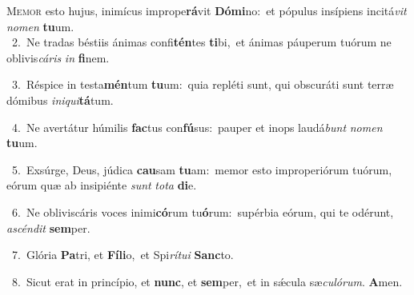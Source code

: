 \lettrine{\initial\textcolor{\initialcolor}{M}}{emor} esto hujus, inimícus imprope\-\textbf{rá}\-vit \textbf{Dó}\-\textbf{mi}no:~\star et pópulus insípiens incitá\textit{vit} \textit{no}\-\textit{men} \textbf{tu}\-um.\\
{\numbfont\textcolor{\numbcolor}{~2.}}~Ne tradas béstiis ánimas confi\-\textbf{tén}\-tes \textbf{ti}\-bi,~\star et ánimas páuperum tuórum ne oblivis\-\textit{cá}\-\textit{ris} \textit{in} \textbf{fi}\-nem.\par
{\numbfont\textcolor{\numbcolor}{~3.}}~Réspice in testa\-\textbf{mén}\-tum \textbf{tu}\-um:~\star quia repléti sunt, qui obscuráti sunt terræ dómibus \textit{in}\-\textit{i}\textit{qui}\textbf{tá}tum.\par
{\numbfont\textcolor{\numbcolor}{~4.}}~Ne avertátur húmilis \textbf{fac}\-tus con\-\textbf{fú}\-sus:~\star pauper et inops laudá\textit{bunt} \textit{no}\-\textit{men} \textbf{tu}\-um.\par
{\numbfont\textcolor{\numbcolor}{~5.}}~Exsúrge, Deus, júdica \textbf{cau}\-sam \textbf{tu}\-am:~\star memor esto improperiórum tuórum, eórum quæ ab insipiénte \textit{sunt} \textit{to}\-\textit{ta} \textbf{di}\-e.\par
{\numbfont\textcolor{\numbcolor}{~6.}}~Ne obliviscáris voces inimi\-\textbf{có}\-rum tu\-\textbf{ó}\-rum:~\star supérbia eórum, qui te odérunt, \textit{a}\-\textit{scén}\textit{dit} \textbf{sem}\-per.\par
{\numbfont\textcolor{\numbcolor}{~7.}}~Glória \textbf{Pa}\-tri, et \textbf{Fí}\-\textbf{li}o,~\star et Spi\-\textit{rí}\-\textit{tu}\textit{i} \textbf{Sanc}\-to.\par
{\numbfont\textcolor{\numbcolor}{~8.}}~Sicut erat in princípio, et \textbf{nunc}\-, et \textbf{sem}\-per,~\star et in sǽcula sæ\-\textit{cu}\-\textit{ló}\textit{rum}. \textbf{A}\-men.\par
